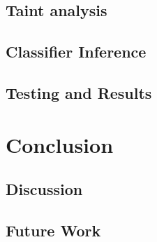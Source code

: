     \section{Taint analysis}
    \section{Classifier Inference}
    \section{Testing and Results}
\chapter{Conclusion}
\label{ch_conclusion}
    \section{Discussion}
    \section{Future Work}

